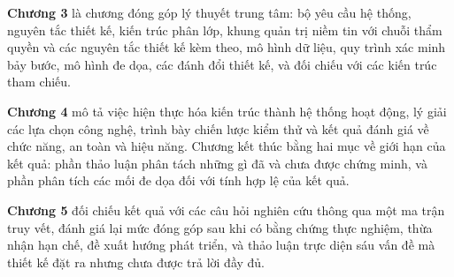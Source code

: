 \noindent \textbf{Chương 3} là chương đóng góp lý thuyết trung tâm: bộ yêu cầu hệ thống, nguyên tắc thiết kế, kiến trúc phân lớp, khung quản trị niềm tin với chuỗi thẩm quyền và các nguyên tắc thiết kế kèm theo, mô hình dữ liệu, quy trình xác minh bảy bước, mô hình đe dọa, các đánh đổi thiết kế, và đối chiếu với các kiến trúc tham chiếu.

\noindent \textbf{Chương 4} mô tả việc hiện thực hóa kiến trúc thành hệ thống hoạt động, lý giải các lựa chọn công nghệ, trình bày chiến lược kiểm thử và kết quả đánh giá về chức năng, an toàn và hiệu năng. Chương kết thúc bằng hai mục về giới hạn của kết quả: phần thảo luận phân tách những gì đã và chưa được chứng minh, và phần phân tích các mối đe dọa đối với tính hợp lệ của kết quả.

\noindent \textbf{Chương 5} đối chiếu kết quả với các câu hỏi nghiên cứu thông qua một ma trận truy vết, đánh giá lại mức đóng góp sau khi có bằng chứng thực nghiệm, thừa nhận hạn chế, đề xuất hướng phát triển, và thảo luận trực diện sáu vấn đề mà thiết kế đặt ra nhưng chưa được trả lời đầy đủ.
